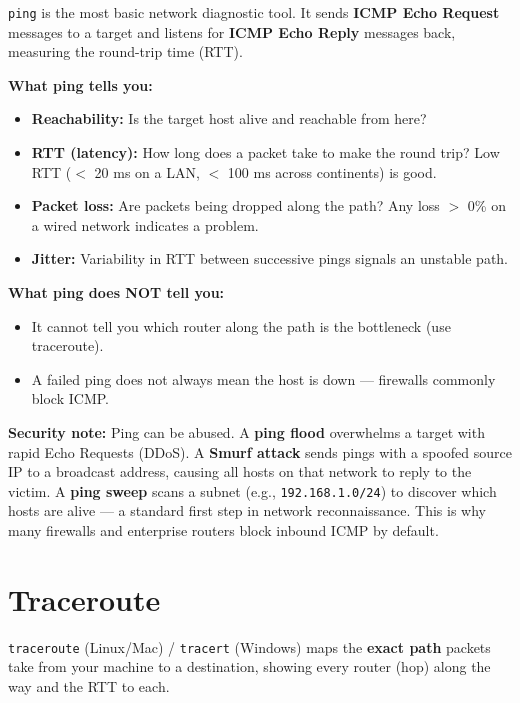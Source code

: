\documentclass[11pt, letterpaper]{article}
\begin{document}
\texttt{ping} is the most basic network diagnostic tool. It sends \textbf{ICMP Echo Request}
messages to a target and listens for \textbf{ICMP Echo Reply} messages back, measuring the
round-trip time (RTT).

\textbf{What ping tells you:}
\begin{itemize}[noitemsep]
  \item \textbf{Reachability:} Is the target host alive and reachable from here?
  \item \textbf{RTT (latency):} How long does a packet take to make the round trip? Low RTT
        ($<$ 20 ms on a LAN, $<$ 100 ms across continents) is good.
  \item \textbf{Packet loss:} Are packets being dropped along the path? Any loss $>$ 0\% on
        a wired network indicates a problem.
  \item \textbf{Jitter:} Variability in RTT between successive pings signals an unstable path.
\end{itemize}

\textbf{What ping does NOT tell you:}
\begin{itemize}[noitemsep]
  \item It cannot tell you which router along the path is the bottleneck (use traceroute).
  \item A failed ping does not always mean the host is down --- firewalls commonly block ICMP.
\end{itemize}

\begin{tcolorbox}[colback=notebg, colframe=noteborder, arc=3pt, boxrule=1pt]
\textbf{Security note:} Ping can be abused. A \textbf{ping flood} overwhelms a target with
rapid Echo Requests (DDoS). A \textbf{Smurf attack} sends pings with a spoofed source IP
to a broadcast address, causing all hosts on that network to reply to the victim. A
\textbf{ping sweep} scans a subnet (e.g., \texttt{192.168.1.0/24}) to discover which hosts
are alive --- a standard first step in network reconnaissance. This is why many firewalls
and enterprise routers block inbound ICMP by default.
\end{tcolorbox}

\section*{Traceroute}

\texttt{traceroute} (Linux/Mac) / \texttt{tracert} (Windows) maps the \textbf{exact path}
packets take from your machine to a destination, showing every router (hop) along the way
and the RTT to each.
\end{document}
